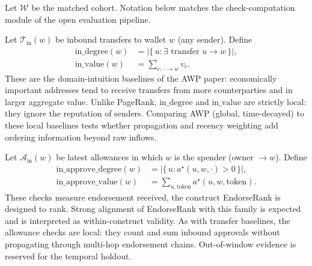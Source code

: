 
Let $\mathcal{W}$ be the matched cohort. Notation below matches the check-computation module of the open evaluation pipeline.


Let $\mathcal{T}_{\mathrm{in}}(w)$ be inbound transfers to wallet $w$ (any sender). Define
\begin{align}
\mathrm{in\_degree}(w)
&=
\bigl|\{\,u : \exists\text{ transfer }u\to w\,\}\bigr|,
\label{eq:in-degree}\\
\mathrm{in\_value}(w)
&=
\sum_{e:\,\cdot\to w} v_e.
\label{eq:in-value}
\end{align}
These are the domain-intuition baselines of the AWP paper: economically important addresses tend to receive transfers from more counterparties and in larger aggregate value. Unlike PageRank, $\mathrm{in\_degree}$ and $\mathrm{in\_value}$ are strictly local: they ignore the reputation of senders. Comparing AWP (global, time-decayed) to these local baselines tests whether propagation and recency weighting add ordering information beyond raw inflows.


Let $\mathcal{A}_{\mathrm{in}}(w)$ be latest allowances in which $w$ is the spender (owner $\to w$). Define
\begin{align}
\mathrm{in\_approve\_degree}(w)
&=
\bigl|\{\,u : a^{\star}(u,w,\cdot)>0\,\}\bigr|,
\label{eq:in-approve-degree}\\
\mathrm{in\_approve\_value}(w)
&=
\sum_{u,\mathrm{token}} a^{\star}(u,w,\mathrm{token}).
\label{eq:in-approve-value}
\end{align}
These checks measure endorsement received, the construct EndorseRank is designed to rank. Strong alignment of EndorseRank with this family is expected and is interpreted as within-construct validity. As with transfer baselines, the allowance checks are local: they count and sum inbound approvals without propagating through multi-hop endorsement chains. Out-of-window evidence is reserved for the temporal holdout.


